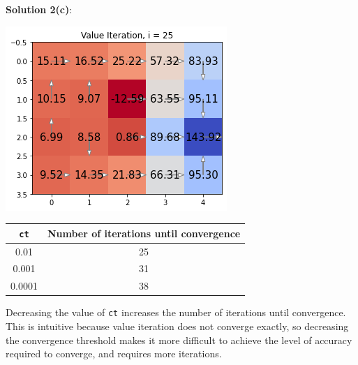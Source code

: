 \documentclass[submit]{harvardml}
\begin{document}
\textbf{Solution 2(c)}:\\
\begin{center}
    \includegraphics[width=0.5\linewidth]{HW6/plots/2c.ct=0.01.png}
\end{center}
\begin{center}
        \begin{tabular}{ |c|c| } 
        \hline
        \texttt{ct} & Number of iterations until convergence \\
        \hline
        0.01 & 25\\
        \hline
        0.001 & 31\\
        \hline
        0.0001 & 38\\
        \hline
        \end{tabular}
\end{center}
Decreasing the value of \texttt{ct} increases the number of iterations until convergence. This is intuitive because value iteration does not converge exactly, so decreasing the convergence threshold makes it more difficult to achieve the level of accuracy required to converge, and requires more iterations.\\
\end{document}
